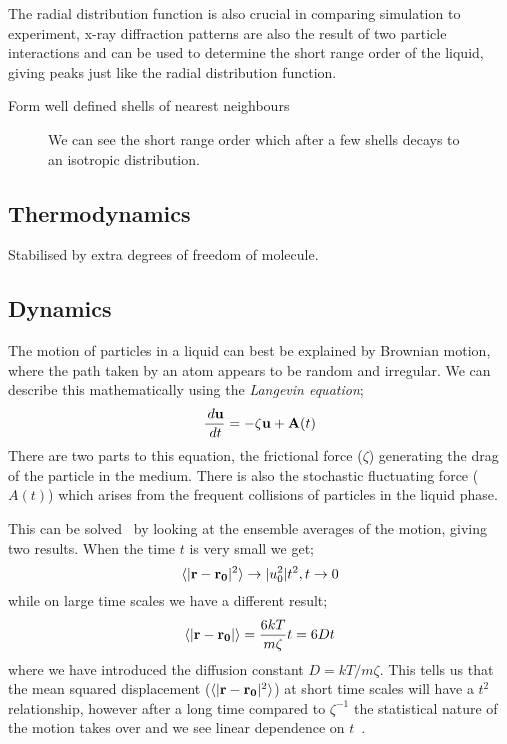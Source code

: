 The radial distribution function is also crucial in comparing simulation to experiment, x-ray diffraction patterns are also the result of two particle interactions and can be used to determine the short range order of the liquid, giving peaks just like the radial distribution function.

Form well defined shells of nearest neighbours~\cite[p2]{barrat:03}
\begin{figure}
    \label{fig:radial distribution}
    \caption{We can see the short range order which after a few shells decays to an isotropic distribution.}
\end{figure}

\subsection{Thermodynamics}
Stabilised by extra degrees of freedom of molecule.

\subsection{Dynamics}
The motion of particles in a liquid can best be explained by Brownian motion, where the path taken by an atom appears to be random and irregular. We can describe this mathematically using the \emph{Langevin equation};
\begin{equation}
    \frac{\,d \mathbf{u}}{\,d t} = - \zeta \mathbf{u} + \mathbf{A}(t)
\end{equation}
There are two parts to this equation, the frictional force ($\zeta$) generating the drag of the particle in the medium. There is also the stochastic fluctuating force ($A(t)$) which arises from the frequent collisions of particles in the liquid phase.

This can be solved~\cite{mcquarrie:75} by looking at the ensemble averages of the motion, giving two results. When the time $t$ is very small we get;
\begin{equation}
    \langle | \mathbf{r} - \mathbf{r_0}|^2 \rangle \rightarrow |u_0^2|t^2,   t \rightarrow 0
\end{equation}
while on large time scales we have a different result;
\begin{equation}
    \langle | \mathbf{r} - \mathbf{r_0} | \rangle = \frac{6kT}{m\zeta} t = 6Dt
\end{equation}
where we have introduced the diffusion constant $D = kT/m\zeta$. This tells us that the mean squared displacement ($\langle | \mathbf{r} - \mathbf{r_0} |^2 \rangle$) at short time scales will have a $t^2$ relationship, however after a long time compared to $\zeta^{-1}$ the statistical nature of the motion takes over and we see linear dependence on $t$~.

